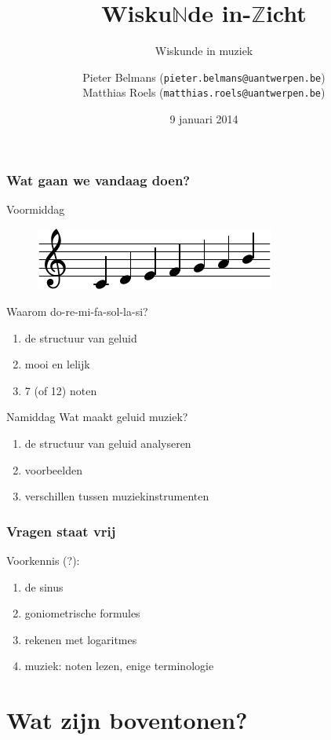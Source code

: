 \documentclass[compress, darktitle, framenumber, totalframenumber]{beamer}
\title{Wisku$\mathbb{N}$de in-$\mathbb{Z}$icht}
\subtitle{Wiskunde in muziek}
\author{Pieter Belmans (\texttt{pieter.belmans@uantwerpen.be}) \\ Matthias Roels (\texttt{matthias.roels@uantwerpen.be})}
\date{9 januari 2014}
\begin{document}
\begin{frame}
  \titlepage
\end{frame}

\begin{frame}
  \frametitle{Wat gaan we vandaag doen?}

  \begin{block}{Voormiddag}
    \begin{figure}
      \centering
      \includegraphics{scores/scale-cropped}
    \end{figure}
    Waarom do-re-mi-fa-sol-la-si?
    \begin{enumerate}
      \item de structuur van geluid
      \item mooi en lelijk
      \item 7 (of 12) noten
    \end{enumerate}
  \end{block}

  \pause

  \begin{block}{Namiddag}
    Wat maakt geluid muziek?
    \begin{enumerate}
      \item de structuur van geluid analyseren
      \item voorbeelden
      \item verschillen tussen muziekinstrumenten
    \end{enumerate}
  \end{block}
\end{frame}

\begin{frame}
  \frametitle{Vragen staat vrij}

  Voorkennis (?):
  \begin{enumerate}
    \item de sinus
    \item goniometrische formules
    \item rekenen met logaritmes
    \item muziek: noten lezen, enige terminologie
  \end{enumerate}
\end{frame}


\section{Wat zijn boventonen?}
\end{document}

